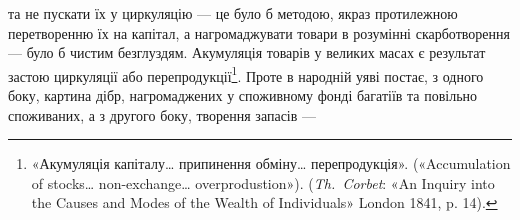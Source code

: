 та не пускати їх у циркуляцію — це було б методою, якраз протилежною
перетворенню їх на капітал, а нагромаджувати товари
в розумінні скарботворення — було б чистим безглуздям.
Акумуляція товарів у великих масах є результат застою циркуляції
або перепродукції\footnote{
«Акумуляція капіталу\dots{} припинення обміну\dots{} перепродукція».
(«Accumulation of stocks\dots{} non-exchange\dots{} overprodustion»).
(\emph{Th.~Corbet}: «An Inquiry into the Causes and Modes of the Wealth of
Individuals» London 1841, p. 14).
}. Проте в народній уяві постає, з одного
боку, картина дібр, нагромаджених у споживному фонді багатіїв
та повільно споживаних, а з другого боку, творення запасів —
\parbreak{}  %
